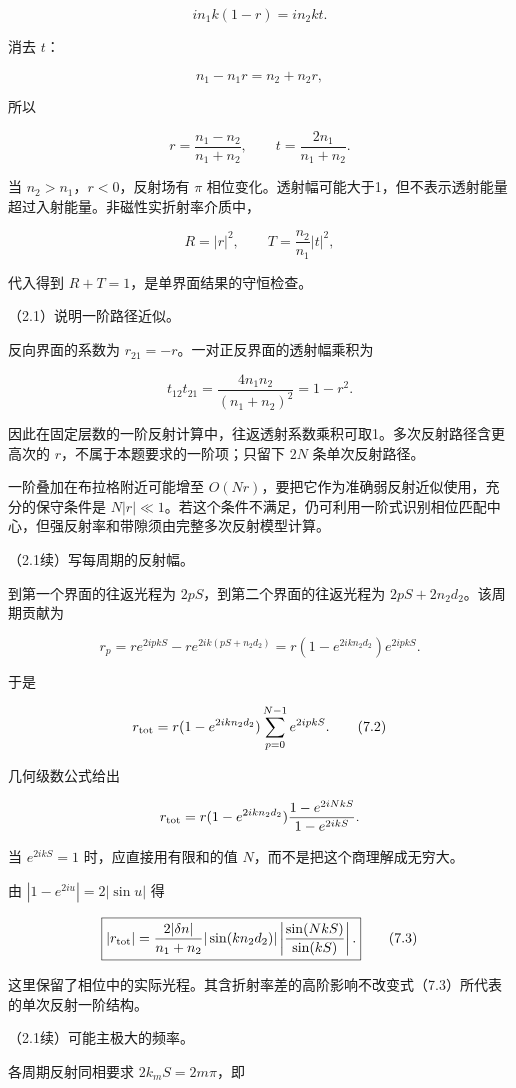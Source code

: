 \documentclass[12pt,a4paper,fontset=fandol]{ctexart}
\begin{document}
\[
in_1k(1-r)=in_2kt.
\]

消去 \(t\)：

\[
n_1-n_1r=n_2+n_2r,
\]

所以

\[
\boxed{r=\frac{n_1-n_2}{n_1+n_2},\qquad
t=\frac{2n_1}{n_1+n_2}.}
\tag{7.1}
\]

当 \(n_2>n_1\)，\(r<0\)，反射场有 \(\pi\)
相位变化。透射幅可能大于1，但不表示透射能量超过入射能量。非磁性实折射率介质中，

\[
R=|r|^2,\qquad T=\frac{n_2}{n_1}|t|^2,
\]

代入得到 \(R+T=1\)，是单界面结果的守恒检查。

（2.1）说明一阶路径近似。

反向界面的系数为 \(r_{21}=-r\)。一对正反界面的透射幅乘积为

\[
t_{12}t_{21}=\frac{4n_1n_2}{(n_1+n_2)^2}=1-r^2.
\]

因此在固定层数的一阶反射计算中，往返透射系数乘积可取1。多次反射路径含更高次的
\(r\)，不属于本题要求的一阶项；只留下 \(2N\) 条单次反射路径。

一阶叠加在布拉格附近可能增至
\(O(Nr)\)，要把它作为准确弱反射近似使用，充分的保守条件是
\(N|r|\ll1\)。若这个条件不满足，仍可利用一阶式识别相位匹配中心，但强反射率和带隙须由完整多次反射模型计算。

（2.1续）写每周期的反射幅。

到第一个界面的往返光程为 \(2pS\)，到第二个界面的往返光程为
\(2pS+2n_2d_2\)。该周期贡献为

\[
r_p=r e^{2ipkS}-r e^{2ik(pS+n_2d_2)}
=r(1-e^{2ikn_2d_2})e^{2ipkS}.
\]

于是

\[
r_{\rm tot}=r(1-e^{2ikn_2d_2})
\sum_{p=0}^{N-1}e^{2ipkS}.
\tag{7.2}
\]

几何级数公式给出

\[
r_{\rm tot}=r(1-e^{2ikn_2d_2})
\frac{1-e^{2iNkS}}{1-e^{2ikS}}.
\]

当 \(e^{2ikS}=1\) 时，应直接用有限和的值
\(N\)，而不是把这个商理解成无穷大。

由 \(|1-e^{2iu}|=2|\sin u|\) 得

\[
\boxed{|r_{\rm tot}|=
\frac{2|\delta n|}{n_1+n_2}|\sin(kn_2d_2)|
\left|\frac{\sin(NkS)}{\sin(kS)}\right|.}
\tag{7.3}
\]

这里保留了相位中的实际光程。其含折射率差的高阶影响不改变式（7.3）所代表的单次反射一阶结构。

（2.1续）可能主极大的频率。

各周期反射同相要求 \(2k_mS=2m\pi\)，即
\end{document}

